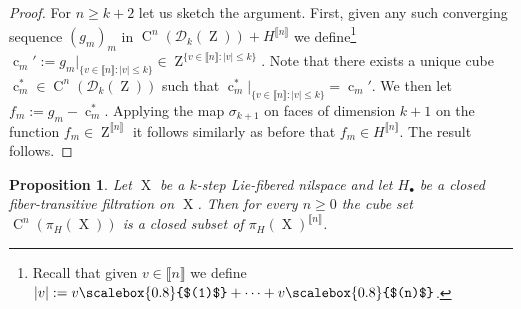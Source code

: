 \documentclass[a4paper,12pt,reqno]{amsart}
\newtheorem{proposition}[theorem]{Proposition}
\theoremstyle{definition}
\newcommand*{\sbr}[1]{\scalebox{0.8}{$(#1)$}}
\newcommand*{\db}[1]{\llbracket #1\rrbracket}
\newcommand{\mc}{\mathcal}
\DeclareMathOperator{\ab}{Z}
\DeclareMathOperator{\q}{c}
\DeclareMathOperator{\ns}{X}
\DeclareMathOperator{\cu}{C}
\begin{document}
\begin{proof}
For $n\ge k+2$ let us sketch the argument. First, given any such converging sequence $(g_m)_m$ in $\cu^n(\mc{D}_k(\ab))+H^{\db{n}}$ we define\footnote{Recall that given $v\in \db{n}$ we define $|v|:=v\sbr{1}+\cdots+v\sbr{n}$.} $\q_m':=g_m|_{\{v\in \db{n}:|v|\le k\}}\in \ab^{\{v\in \db{n}:|v|\le k\}}$. Note that there exists a unique cube $\q_m^*\in \cu^n(\mc{D}_k(\ab))$ such that $\q_m^*|_{\{v\in \db{n}:|v|\le k\}} = \q_m'$. We then let  $f_m:=g_m-\q_m^*$. Applying the map $\sigma_{k+1}$ on faces of dimension $k+1$ on the function $f_m\in \ab^{\db{n}}$ it follows similarly as before that $f_m\in H^{\db{n}}$. The result follows.
\end{proof}

\begin{proposition}\label{prop:closure-cubes-coset}
Let $\ns$ be a $k$-step Lie-fibered nilspace and let $H_\bullet$ be a closed fiber-transitive filtration on $\ns$. Then for every $n\ge 0$ the cube set $\cu^n(\pi_H(\ns))$ is a closed subset of $\pi_H(\ns)^{\db{n}}$.
\end{proposition}
\end{document}
